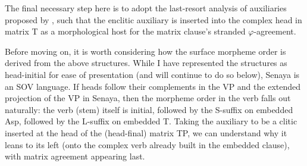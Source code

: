 \documentclass[output=paper
,modfonts
,nonflat]{langsci/langscibook}
\begin{document}
\begin{figure}[!h]
	\begin{exe}
		
		\ex \label{tree2}
	\end{exe} \vspace{-0.6cm}	
\end{figure}
\newpage
\noindent The final necessary step here is to adopt the last-resort analysis of auxiliaries proposed by \citet{Bjorkman11}, such that the enclitic auxiliary is inserted into the complex head in matrix T as a morphological host for the matrix clause's stranded $\varphi$-agreement.

Before moving on, it is worth considering how the surface morpheme order is derived from the above structures. While I have represented the structures as head-initial for ease of presentation (and will continue to do so below), Senaya is an SOV language. If heads follow their complements in the VP and the extended projection of the VP in Senaya, then the morpheme order in the verb falls out naturally:  the verb (stem) itself is initial, followed by the S-suffix on embedded Asp, followed by the L-suffix on embedded T. Taking the auxiliary to be a clitic inserted at the head of the (head-final) matrix TP, we can understand why it leans to its left (onto the complex verb already built in the embedded clause), with matrix agreement appearing last.
\end{document}
